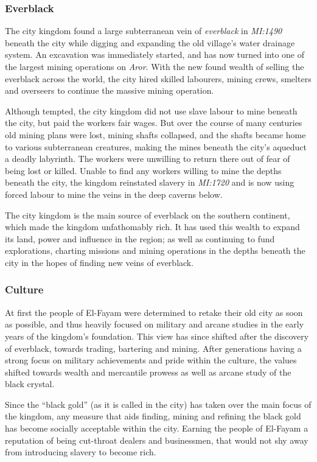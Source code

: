 \subsubsection*{Everblack}

The city kingdom found a large subterranean vein of \emph{everblack} in
\emph{MI:1490} beneath the city while digging and expanding the old village's
water drainage system. An excavation was immediately started, and has now
turned into one of the largest mining operations on \emph{Aror}. With the new
found wealth of selling the everblack across the world, the city hired skilled
labourers, mining crews, smelters and overseers to continue the massive mining
operation.

Although tempted, the city kingdom did not use slave labour to mine beneath
the city, but paid the workers fair wages. But over the course of many
centuries old mining plans were lost, mining shafts collapsed, and the shafts
became home to various subterranean creatures, making the mines beneath the
city's aqueduct a deadly labyrinth. The workers were unwilling to return
there out of fear of being lost or killed. Unable to find any workers willing
to mine the depths beneath the city, the kingdom reinstated slavery in
\emph{MI:1720} and is now using forced labour to mine the veins in the deep
caverns below.

The city kingdom is the main source of everblack on the southern continent,
which made the kingdom unfathomably rich. It has used this wealth to expand
its land, power and influence in the region; as well as continuing to fund
explorations, charting missions and mining operations in the depths beneath
the city in the hopes of finding new veins of everblack.

\subsubsection*{Culture}

At first the people of El-Fayam were determined to retake their old city as
soon as possible, and thus heavily focused on military and arcane studies in
the early years of the kingdom's foundation. This view has since shifted after
the discovery of everblack, towards trading, bartering and mining. After
generations having a strong focus on military achievements and pride within
the culture, the values shifted towards wealth and mercantile prowess as well
as arcane study of the black crystal.

Since the ``black gold'' (as it is called in the city) has taken over the main
focus of the kingdom, any measure that aids finding, mining and refining the
black gold has become socially acceptable within the city. Earning the people
of El-Fayam a reputation of being cut-throat dealers and businessmen, that
would not shy away from introducing slavery to become rich.

